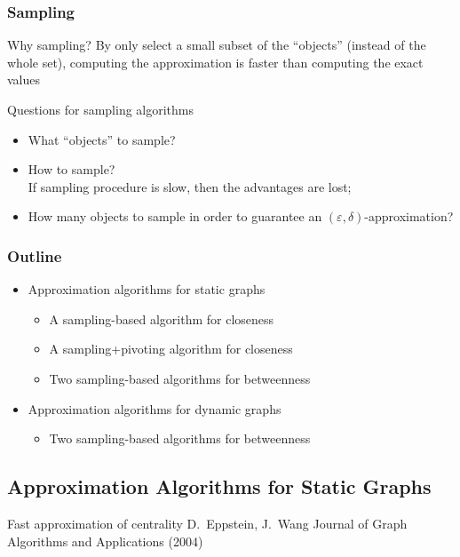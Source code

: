 \begin{frame}
  \frametitle{Sampling}
  \begin{block}{Why sampling?}
    By only select a small subset of the ``objects'' (instead of the whole set),
    computing the approximation is faster than computing the exact values
  \end{block}
  \pause
  \begin{block}{Questions for sampling algorithms}
    \begin{itemize}
      \item What ``objects'' to sample?
        \pause
      \item How to sample?\\
        \quad If sampling procedure is slow, then the advantages are lost;
        \pause
      \item How many objects to sample in order to guarantee an
        $(\varepsilon,\delta)$-approximation?
    \end{itemize}
  \end{block}
\end{frame}

\begin{frame}
  \frametitle{Outline}
  \begin{itemize}
    \item Approximation algorithms for static graphs
      \begin{itemize}
        \item A sampling-based algorithm for closeness
        \item A sampling+pivoting algorithm for closeness
        \item Two sampling-based algorithms for betweenness
      \end{itemize}
    \item Approximation algorithms for dynamic graphs
      \begin{itemize}
        \item Two sampling-based algorithms for betweenness
      \end{itemize}
  \end{itemize}
\end{frame}

\subsection{Approximation Algorithms for Static Graphs}

\begin{frame}
  \centering
  \vfill
  {\huge Fast approximation of centrality}
  \vfill
  {\Large D.~Eppstein, J.~Wang}
  \vfill
  {\large Journal of Graph Algorithms and Applications (2004)}
  \vfill
\end{frame}


